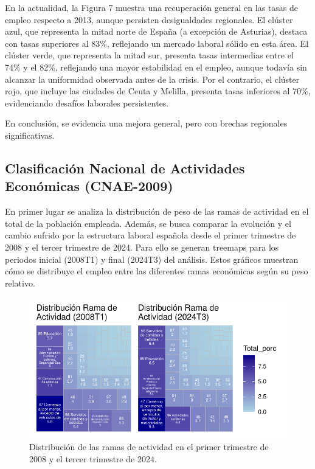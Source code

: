 \documentclass[Universitat de
València,article,submit,moreauthors,pdftex]{Definitions/mdpi}
\begin{document}
En la actualidad, la Figura 7 muestra una recuperación general en las
tasas de empleo respecto a 2013, aunque persisten desigualdades
regionales. El clúster azul, que representa la mitad norte de España (a
excepción de Asturias), destaca con tasas superiores al 83\%, reflejando
un mercado laboral sólido en esta área. El clúster verde, que representa
la mitad sur, presenta tasas intermedias entre el 74\% y el 82\%,
reflejando una mayor estabilidad en el empleo, aunque todavía sin
alcanzar la uniformidad observada antes de la crisis. Por el contrario,
el clúster rojo, que incluye las ciudades de Ceuta y Melilla, presenta
tasas inferiores al 70\%, evidenciando desafíos laborales persistentes.

En conclusión, se evidencia una mejora general, pero con brechas
regionales significativas.

\subsection{\texorpdfstring{\textbf{Clasificación Nacional de
Actividades Económicas
(CNAE-2009)}}{Clasificación Nacional de Actividades Económicas (CNAE-2009)}}\label{clasificaciuxf3n-nacional-de-actividades-econuxf3micas-cnae-2009-1}

En primer lugar se analiza la distribución de peso de las ramas de
actividad en el total de la población empleada. Además, se busca
comparar la evolución y el cambio sufrido por la estructura laboral
española desde el primer trimestre de 2008 y el tercer trimestre de
2024. Para ello se generan treemaps para los periodos inicial (2008T1) y
final (2024T3) del análisis. Estos gráficos muestran cómo se distribuye
el empleo entre las diferentes ramas económicas según su peso relativo.

\begin{figure}

{\centering \includegraphics{ProyectoAED2024_files/figure-latex/unnamed-chunk-38-1} 

}

\caption{Distribución de las ramas de actividad en el primer trimestre de 2008 y el tercer trimestre de 2024.}\label{fig:unnamed-chunk-38}
\end{figure}
\end{document}
